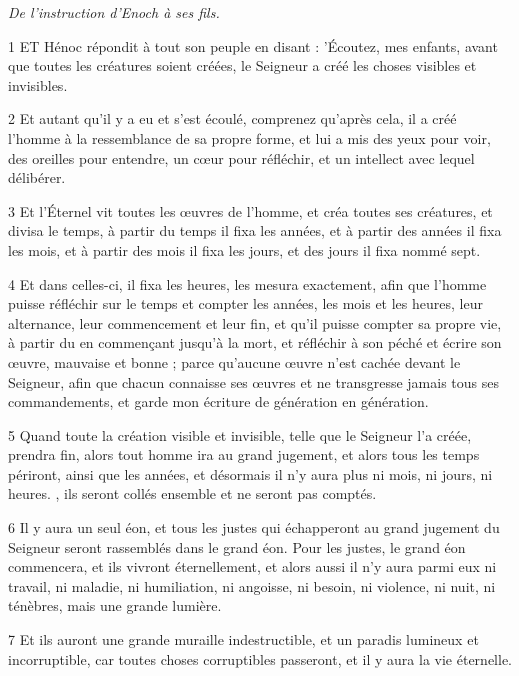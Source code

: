 \par \textit{De l'instruction d'Enoch à ses fils.}

\par 1 ET Hénoc répondit à tout son peuple en disant : 'Écoutez, mes enfants, avant que toutes les créatures soient créées, le Seigneur a créé les choses visibles et invisibles.

\par 2 Et autant qu'il y a eu et s'est écoulé, comprenez qu'après cela, il a créé l'homme à la ressemblance de sa propre forme, et lui a mis des yeux pour voir, des oreilles pour entendre, un cœur pour réfléchir, et un intellect avec lequel délibérer.

\par 3 Et l'Éternel vit toutes les œuvres de l'homme, et créa toutes ses créatures, et divisa le temps, à partir du temps il fixa les années, et à partir des années il fixa les mois, et à partir des mois il fixa les jours, et des jours il fixa nommé sept.

\par 4 Et dans celles-ci, il fixa les heures, les mesura exactement, afin que l'homme puisse réfléchir sur le temps et compter les années, les mois et les heures, leur alternance, leur commencement et leur fin, et qu'il puisse compter sa propre vie, à partir du en commençant jusqu'à la mort, et réfléchir à son péché et écrire son œuvre, mauvaise et bonne ; parce qu'aucune œuvre n'est cachée devant le Seigneur, afin que chacun connaisse ses œuvres et ne transgresse jamais tous ses commandements, et garde mon écriture de génération en génération.

\par 5 Quand toute la création visible et invisible, telle que le Seigneur l'a créée, prendra fin, alors tout homme ira au grand jugement, et alors tous les temps périront, ainsi que les années, et désormais il n'y aura plus ni mois, ni jours, ni heures. , ils seront collés ensemble et ne seront pas comptés.

\par 6 Il y aura un seul éon, et tous les justes qui échapperont au grand jugement du Seigneur seront rassemblés dans le grand éon. Pour les justes, le grand éon commencera, et ils vivront éternellement, et alors aussi il n'y aura parmi eux ni travail, ni maladie, ni humiliation, ni angoisse, ni besoin, ni violence, ni nuit, ni ténèbres, mais une grande lumière.

\par 7 Et ils auront une grande muraille indestructible, et un paradis lumineux et incorruptible, car toutes choses corruptibles passeront, et il y aura la vie éternelle.

